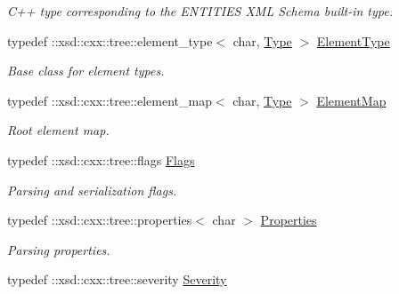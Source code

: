 \begin{DoxyCompactItemize}
\begin{DoxyCompactList}\small\item\em C++ type corresponding to the ENTITIES XML Schema built-\/in type. \item\end{DoxyCompactList}\item 
\hypertarget{namespacexml__schema_a7dffa68a901bbdd836d7ff3a3e10c9d2}{
typedef ::xsd::cxx::tree::element\_\-type$<$ char, \hyperlink{namespacexml__schema_ad34e8fd175bf4f9fece6c670b01aa239}{Type} $>$ \hyperlink{namespacexml__schema_a7dffa68a901bbdd836d7ff3a3e10c9d2}{ElementType}}
\label{namespacexml__schema_a7dffa68a901bbdd836d7ff3a3e10c9d2}

\begin{DoxyCompactList}\small\item\em Base class for element types. \item\end{DoxyCompactList}\item 
\hypertarget{namespacexml__schema_a4fb4e959438708240e2f787eee446141}{
typedef ::xsd::cxx::tree::element\_\-map$<$ char, \hyperlink{namespacexml__schema_ad34e8fd175bf4f9fece6c670b01aa239}{Type} $>$ \hyperlink{namespacexml__schema_a4fb4e959438708240e2f787eee446141}{ElementMap}}
\label{namespacexml__schema_a4fb4e959438708240e2f787eee446141}

\begin{DoxyCompactList}\small\item\em Root element map. \item\end{DoxyCompactList}\item 
\hypertarget{namespacexml__schema_affb4c227cbd9aa7453dd1dc5a1401943}{
typedef ::xsd::cxx::tree::flags \hyperlink{namespacexml__schema_affb4c227cbd9aa7453dd1dc5a1401943}{Flags}}
\label{namespacexml__schema_affb4c227cbd9aa7453dd1dc5a1401943}

\begin{DoxyCompactList}\small\item\em Parsing and serialization flags. \item\end{DoxyCompactList}\item 
\hypertarget{namespacexml__schema_ad27ce19a7ee1d3b1064092648898f64c}{
typedef ::xsd::cxx::tree::properties$<$ char $>$ \hyperlink{namespacexml__schema_ad27ce19a7ee1d3b1064092648898f64c}{Properties}}
\label{namespacexml__schema_ad27ce19a7ee1d3b1064092648898f64c}

\begin{DoxyCompactList}\small\item\em Parsing properties. \item\end{DoxyCompactList}\item 
\hypertarget{namespacexml__schema_a1385d97f1fb2a3b623185e7ef2a12c08}{
typedef ::xsd::cxx::tree::severity \hyperlink{namespacexml__schema_a1385d97f1fb2a3b623185e7ef2a12c08}{Severity}}
\label{namespacexml__schema_a1385d97f1fb2a3b623185e7ef2a12c08}


\end{DoxyCompactItemize}
